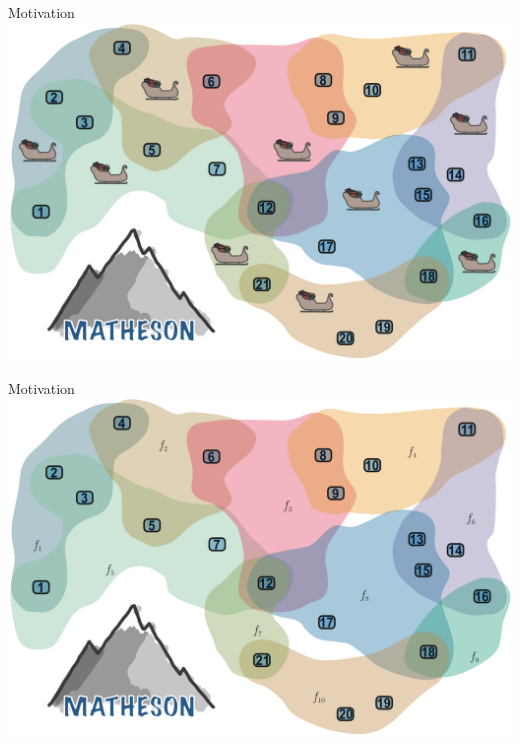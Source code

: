 \documentclass[10pt]{beamer}
\begin{document}
\begin{frame}[fragile]{Motivation}
    \hspace*{-.25em}\includegraphics[width=\textwidth]{Images/Matheson/Matheson_06}
\end{frame}

\begin{frame}[fragile]{Motivation}
    \hspace*{-.25em}\includegraphics[width=\textwidth]{Images/Matheson/Matheson_07}
\end{frame}

\end{document}
